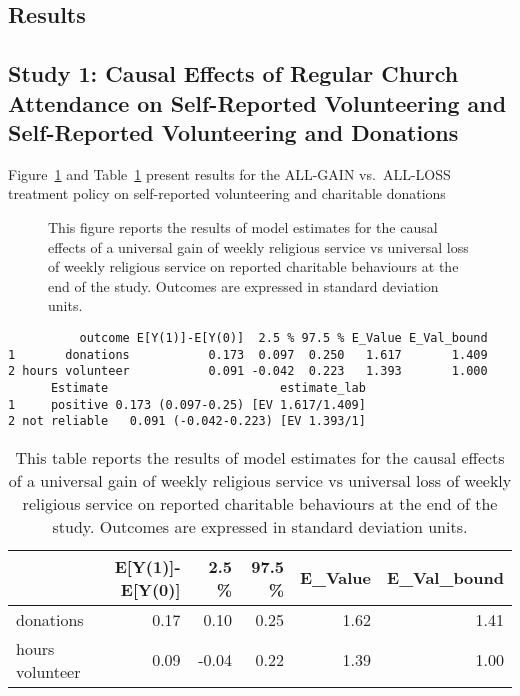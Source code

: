 \documentclass[
  singlecolumn]{article}
\begin{document}
\newpage{}

\subsection{Results}\label{results}

\subsection{Study 1: Causal Effects of Regular Church Attendance on
Self-Reported Volunteering and Self-Reported Volunteering and
Donations}\label{study-1-causal-effects-of-regular-church-attendance-on-self-reported-volunteering-and-self-reported-volunteering-and-donations}

Figure~\ref{fig-1_1} and Table~\ref{tbl-1_1} present results for the
ALL-GAIN vs.~ALL-LOSS treatment policy on self-reported volunteering and
charitable donations

\begin{figure}


\caption{\label{fig-1_1}This figure reports the results of model
estimates for the causal effects of a universal gain of weekly religious
service vs universal loss of weekly religious service on reported
charitable behaviours at the end of the study. Outcomes are expressed in
standard deviation units.}

\end{figure}%

\begin{verbatim}
          outcome E[Y(1)]-E[Y(0)]  2.5 % 97.5 % E_Value E_Val_bound
1       donations           0.173  0.097  0.250   1.617       1.409
2 hours volunteer           0.091 -0.042  0.223   1.393       1.000
      Estimate                        estimate_lab
1     positive 0.173 (0.097-0.25) [EV 1.617/1.409]
2 not reliable   0.091 (-0.042-0.223) [EV 1.393/1]
\end{verbatim}

\begin{longtable}[]{@{}lrrrrr@{}}

\caption{\label{tbl-1_1}This table reports the results of model
estimates for the causal effects of a universal gain of weekly religious
service vs universal loss of weekly religious service on reported
charitable behaviours at the end of the study. Outcomes are expressed in
standard deviation units.}

\tabularnewline

\toprule\noalign{}
& E{[}Y(1){]}-E{[}Y(0){]} & 2.5 \% & 97.5 \% & E\_Value &
E\_Val\_bound \\
\midrule\noalign{}
\endhead
\bottomrule\noalign{}
\endlastfoot
donations & 0.17 & 0.10 & 0.25 & 1.62 & 1.41 \\
hours volunteer & 0.09 & -0.04 & 0.22 & 1.39 & 1.00 \\

\end{longtable}
\end{document}
